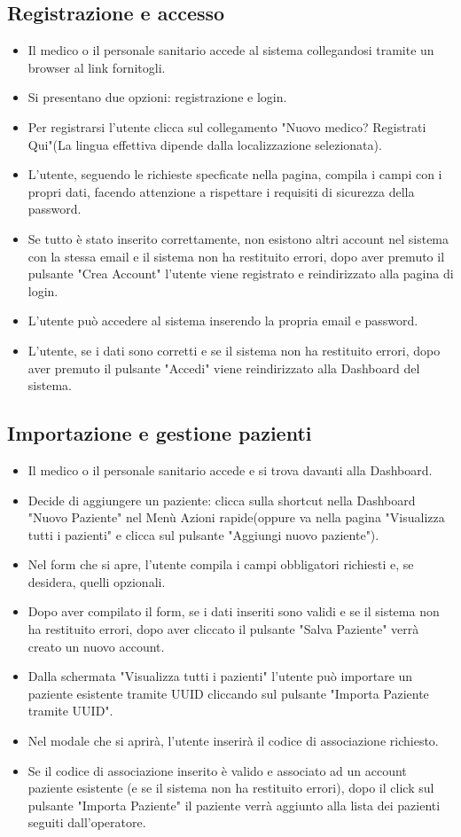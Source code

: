 \documentclass[12pt,a4paper,oneside]{report}
\begin{document}
\subsection{Registrazione e accesso}
\begin{itemize}
    \item Il medico o il personale sanitario accede al sistema collegandosi tramite un browser al link fornitogli.
    \item Si presentano due opzioni: registrazione e login.
    \item Per registrarsi l'utente clicca sul collegamento "Nuovo medico? Registrati Qui"(La lingua effettiva dipende dalla localizzazione selezionata).
    \item L'utente, seguendo le richieste specficate nella pagina, compila i campi con i propri dati, facendo attenzione a rispettare i requisiti di sicurezza della password.
    \item Se tutto è stato inserito correttamente, non esistono altri account nel sistema con la stessa email e il sistema non ha restituito errori, dopo aver premuto il pulsante "Crea Account" l'utente viene registrato e reindirizzato alla pagina di login.
    \item L'utente può accedere al sistema inserendo la propria email e password.
    \item L'utente, se i dati sono corretti e se il sistema non ha restituito errori, dopo aver premuto il pulsante "Accedi" viene reindirizzato alla Dashboard del sistema.
\end{itemize}
\subsection{Importazione e gestione pazienti}
\begin{itemize}
    \item Il medico o il personale sanitario accede e si trova davanti alla Dashboard.
    \item Decide di aggiungere un paziente: clicca sulla shortcut nella Dashboard "Nuovo Paziente" nel Menù Azioni rapide(oppure va nella pagina "Visualizza tutti i pazienti" e clicca sul pulsante "Aggiungi nuovo paziente").
    \item Nel form che si apre, l'utente compila i campi obbligatori richiesti e, se desidera, quelli opzionali.
    \item Dopo aver compilato il form, se i dati inseriti sono validi e se il sistema non ha restituito errori, dopo aver cliccato il pulsante "Salva Paziente" verrà creato un nuovo account.
    \item Dalla schermata "Visualizza tutti i pazienti" l'utente può importare un paziente esistente tramite UUID cliccando sul pulsante "Importa Paziente tramite UUID".
    \item Nel modale che si aprirà, l'utente inserirà il codice di associazione richiesto.
    \item Se il codice di associazione inserito è valido e associato ad un account paziente esistente (e se il sistema non ha restituito errori), dopo il click sul pulsante "Importa Paziente" il paziente verrà aggiunto alla lista dei pazienti seguiti dall'operatore.
\end{itemize}
\end{document}
